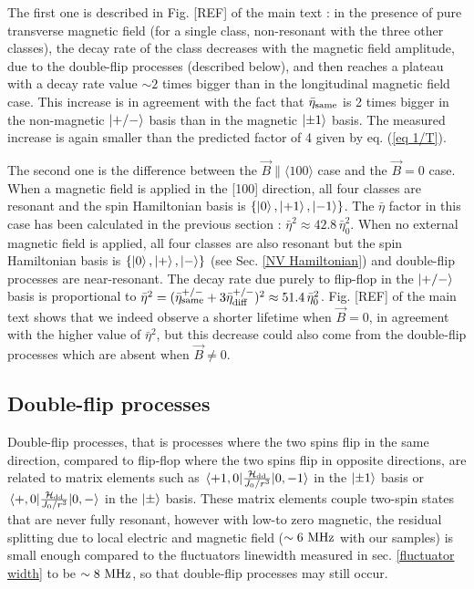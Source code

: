 \documentclass[preprintnumbers,amsmath,amssymb,onecolumn,12pt]{revtex4-2}
\begin{document}
The first one is described in Fig. [REF] of the main text : in the presence of pure transverse magnetic field (for a single class, non-resonant with the three other classes), the decay rate of the class decreases with the magnetic field amplitude, due to the double-flip processes (described below), and then reaches a plateau with a decay rate value $\sim 2$ times bigger than in the longitudinal magnetic field case. This increase is in agreement with the fact that $\bar{\eta}_{\rm same}$ is 2 times bigger in the non-magnetic $\ket{+/-}$ basis than in the magnetic $\ket{\pm 1}$ basis. The measured increase is again smaller than the predicted factor of 4 given by eq. (\ref{eq 1/T}).

The second one is the difference between the $\vec{B} \parallel \langle 100 \rangle$ case and the $\vec{B}=0$ case. When a magnetic field is applied in the [100] direction, all four classes are resonant and the spin Hamiltonian basis is $\{ \ket{0},\ket{+1},\ket{-1} \} $. The $\bar \eta$ factor in this case has been calculated in the previous section : $\bar \eta^2\approx 42.8\, \bar \eta_0^2$. When no external magnetic field is applied, all four classes are also resonant but the spin Hamiltonian basis is  $\{ \ket{0},\ket{+},\ket{-} \} $ (see Sec. \ref{NV Hamiltonian}) and double-flip processes are near-resonant. The decay rate due purely to flip-flop in the $\ket{+/-}$ basis is proportional to $\bar \eta^2 = (\bar{\eta}_{\rm same}^{+/-} + 3\bar{\eta}_{\rm diff}^{+/-})^2 \approx 51.4\, \bar \eta_0^2$. Fig. [REF] of the main text shows that we indeed observe a shorter lifetime when $\vec B=0$, in agreement with the higher value of $\bar \eta^2$, but this decrease could also come from the double-flip processes which are absent when $\vec B \neq 0$.

\subsection{Double-flip processes}

Double-flip processes, that is processes where the two spins flip in the same direction, compared to flip-flop where the two spins flip in opposite directions, are related to matrix elements  such as $\mel{+1,0}{\frac{\mathcal{H}_{\rm dd}}{J_0/r^3}}{0,-1}$ in the $\ket{\pm 1}$ basis or $\mel{+,0}{\frac{\mathcal{H}_{\rm dd}}{J_0/r^3}}{0,-}$ in the $\ket{\pm}$ basis. These matrix elements couple two-spin states that are never fully resonant, however with low-to zero magnetic, the residual splitting due to local electric and magnetic field ($\sim 6\ \rm MHz$ with our samples) is small enough compared to the fluctuators linewidth  measured in sec. \ref{fluctuator width} to be $\sim 8\ \rm MHz$, so that double-flip processes may still occur.
\end{document}
